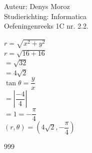 \documentclass[a4paper]{article}
\begin{document}
\noindent \large Auteur: Denys Moroz\\
\noindent \large Studierichting: Informatica\\
\noindent \large Oefeningenreeks 1C nr. 2.2.\\

\medskip

\normalsize

$r=\sqrt{x^2+y^2}$\\

$r=\sqrt{16+16}$\\

$=\sqrt{32}$\\

$=4\sqrt{2}$\\

$\tan\theta=\dfrac{y}{x}$\\

$=\left|\dfrac{-4}{4}\right|$\\

$=1=-\dfrac{\pi}{4}$\\

$\left(r,\theta\right)=\left(4\sqrt{2},-\dfrac{\pi}{4}\right)$\\


\begin{thebibliography}{999}
\end{thebibliography}
\end{document}
